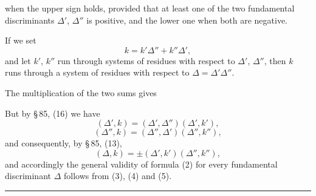 
when the upper sign holds, provided that at least one of the two fundamental discriminants $\Delta'$, $\Delta''$ is positive, and the lower one when both are negative.

If we set
\[
k = k'\Delta'' + k''\Delta',
\]
and let $k'$, $k''$ run through systems of residues with respect to $\Delta'$, $\Delta''$, then $k$ runs through a system of residues with respect to $\Delta = \Delta'\Delta''$.

The multiplication of the two sums
gives

But by \S\,85, (16) we have
\[
(\Delta',k) = (\Delta',\Delta'')(\Delta',k'),
\]
\[
(\Delta'',k) = (\Delta'',\Delta')(\Delta'',k''),
\]
and consequently, by \S\,85, (13),
\[
(\Delta,k) = \pm(\Delta',k')(\Delta'',k''),
\]
and accordingly the general validity of formula (2) for every fundamental discriminant $\Delta$ follows from (3), (4) and (5).

\begin{center}\rule{0.2\linewidth}{0.4pt}\end{center}
